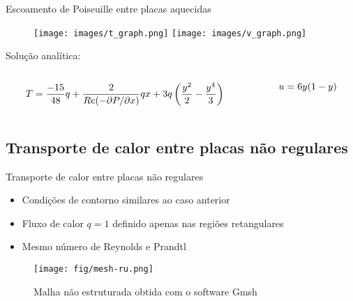 \documentclass{beamer}
\begin{document}
    \begin{frame}{Escoamento de Poiseuille entre placas aquecidas}
        \begin{figure}[H]
        \centering
        	\texttt{[image: images/t\_graph.png]} \hspace{0.2cm}
			\texttt{[image: images/v\_graph.png]} %
		
		\end{figure}
		
		\small{Solução analítica:}
			\begin{columns}
			\hspace{0.6cm}\begin{column}{0.5\textwidth}
         	\footnotesize{\begin{equation} 
         		T = \frac{-15}{48}q + \frac{2}{Re (-\partial P / \partial x)}qx + 3q \left(\frac{y^2}{2} - \frac{y^4}{3} \right) \notag
         	\end{equation}}
         	\end{column}
         	\begin{column}{0.5\textwidth}
\footnotesize{\begin{equation} 
         		u = 6y(1-y) \notag
         	\end{equation}}

         	\end{column}
         	\end{columns}
    \end{frame}
  
    
    \subsection{Transporte de calor entre placas não regulares}
    \begin{frame}{Transporte de calor entre placas não regulares}
		\begin{itemize}
		\item Condições de contorno similares ao caso anterior
		\item Fluxo de calor $q=1$ definido apenas nas regiões retangulares
		
		\item Mesmo número de Reynolds e Prandtl 
		\end{itemize}

		\begin{figure}
        	\texttt{[image: fig/mesh-ru.png]}
        	\caption{Malha não estruturada obtida com o software Gmsh}
        \end{figure}		
		
    \end{frame}
    
\end{document}
